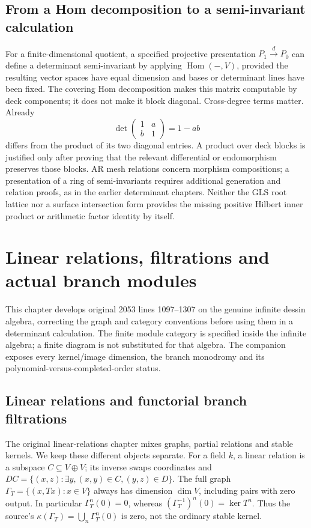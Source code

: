 \documentclass[11pt,oneside,openany]{book}
\theoremstyle{definition}\newtheorem{definition}[theorem]{Definition}
\theoremstyle{remark}\newtheorem{remark}[theorem]{Remark}
\begin{document}
\section{From a Hom decomposition to a semi-invariant calculation}
For a finite-dimensional quotient, a specified projective presentation
$P_1\xrightarrow{d}P_0$ can define a determinant semi-invariant by applying
$\operatorname{Hom}(-,V)$, provided the resulting vector spaces have equal
dimension and bases or determinant lines have been fixed. The covering Hom
decomposition makes this matrix computable by deck components; it does not
make it block diagonal. Cross-degree terms matter. Already
\[
 \det\begin{pmatrix}1&a\\b&1\end{pmatrix}=1-ab
\]
differs from the product of its two diagonal entries. A product over deck
blocks is justified only after proving that the relevant differential or
endomorphism preserves those blocks. AR mesh relations concern morphism
compositions; a presentation of a ring of semi-invariants requires additional
generation and relation proofs, as in the earlier determinant chapters.
Neither the GLS root lattice nor a surface intersection form provides the
missing positive Hilbert inner product or arithmetic factor identity by
itself.

\chapter{Linear relations, filtrations and actual branch modules}
\label{rel:chapter}
This chapter develops original 2053 lines 1097--1307 on the genuine infinite
dessin algebra, correcting the graph and category conventions before
using them in a determinant calculation. The finite module category is
specified inside the infinite algebra; a finite diagram is not substituted
for that algebra. The companion exposes every kernel/image dimension,
the branch monodromy and its polynomial-versus-completed-order status.
\section{Linear relations and functorial branch filtrations}\label{rel:core}
The original linear-relations chapter mixes graphs, partial relations and
stable kernels. We keep these different objects separate. For a field $k$,
a linear relation is a subspace $C\subseteq V\oplus V$; its inverse swaps
coordinates and $DC=\{(x,z):\exists y,(x,y)\in C,(y,z)\in D\}$.
The full graph $\Gamma_T=\{(x,Tx):x\in V\}$ always has dimension
$\dim V$, including pairs with zero output. In particular
$\Gamma_T^n(0)=0$, whereas $(\Gamma_T^{-1})^n(0)=\ker T^n$.
Thus the source's $\kappa(\Gamma_T)=\bigcup_n\Gamma_T^n(0)$ is zero,
not the ordinary stable kernel.
\end{document}
